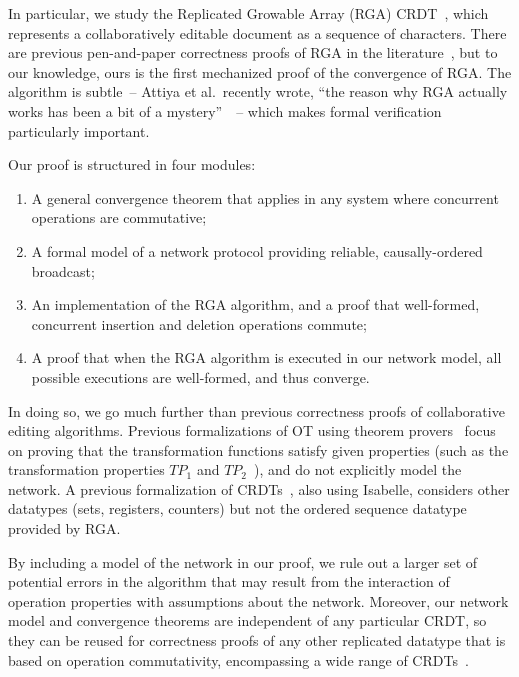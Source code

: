 \documentclass[acmlarge,review,anonymous]{acmart}\settopmatter{printfolios=true}
\begin{document}
In particular, we study the Replicated Growable Array (RGA) CRDT~\cite{Roh:2011dw}, which represents
a collaboratively editable document as a sequence of characters. There are previous pen-and-paper
correctness proofs of RGA in the literature~\cite{Attiya:2016kh,Kleppmann:2016ve,Roh:2009ws}, but to
our knowledge, ours is the first mechanized proof of the convergence of RGA. The algorithm is
subtle~-- Attiya et al.\ recently wrote, ``the reason why RGA actually works has been a bit of a
mystery''~\cite{Attiya:2016kh}~-- which makes formal verification particularly important.

Our proof is structured in four modules:
\begin{enumerate}
    \item A general convergence theorem that applies in any system where concurrent operations are
        commutative;
    \item A formal model of a network protocol providing reliable, causally-ordered broadcast;
    \item An implementation of the RGA algorithm, and a proof that well-formed, concurrent insertion
        and deletion operations commute;
    \item A proof that when the RGA algorithm is executed in our network model, all possible
        executions are well-formed, and thus converge.
\end{enumerate}

In doing so, we go much further than previous correctness proofs of collaborative editing
algorithms. Previous formalizations of OT using theorem
provers~\cite{Imine:2003ks,Imine:2006kn,Sinchuk:2016cf,Jungnickel:2015ua} focus on proving that the
transformation functions satisfy given properties (such as the transformation properties
$\mathit{TP}_1$ and $\mathit{TP}_2$~\cite{Oster:2006tr,Ressel:1996wx}), and do not explicitly model
the network. A previous formalization of CRDTs~\cite{Zeller:2014fl}, also using Isabelle, considers
other datatypes (sets, registers, counters) but not the ordered sequence datatype provided by RGA.

By including a model of the network in our proof, we rule out a larger set of potential errors in
the algorithm that may result from the interaction of operation properties with assumptions about
the network. Moreover, our network model and convergence theorems are independent of any particular
CRDT, so they can be reused for correctness proofs of any other replicated datatype that is based on
operation commutativity, encompassing a wide range of CRDTs~\cite{Baquero:2014ed}.
\end{document}
